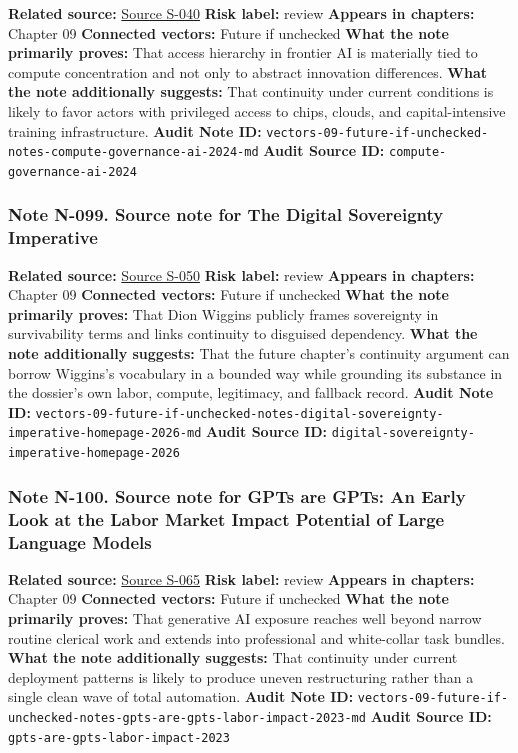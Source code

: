 \documentclass[
  american,
  11pt,
  letterpaper,
]{article}
\begin{document}
\textbf{Related source:}
\hyperref[source-s-040-computing-power-and-the-governance-of-artificial-intelligence]{Source
S-040} \textbf{Risk label:} review \textbf{Appears in chapters:} Chapter
09 \textbf{Connected vectors:} Future if unchecked \textbf{What the note
primarily proves:} That access hierarchy in frontier AI is materially
tied to compute concentration and not only to abstract innovation
differences. \textbf{What the note additionally suggests:} That
continuity under current conditions is likely to favor actors with
privileged access to chips, clouds, and capital-intensive training
infrastructure. \textbf{Audit Note ID:}
\texttt{vectors-09-future-if-unchecked-notes-compute-governance-ai-2024-md}
\textbf{Audit Source ID:} \texttt{compute-governance-ai-2024}

\subsubsection{Note N-099. Source note for The Digital Sovereignty
Imperative}\label{note-n-099-vectors-09-future-if-unchecked-notes-digital-sovereignty-imperative-homepage-2026-md}

\textbf{Related source:}
\hyperref[source-s-050-the-digital-sovereignty-imperative]{Source S-050}
\textbf{Risk label:} review \textbf{Appears in chapters:} Chapter 09
\textbf{Connected vectors:} Future if unchecked \textbf{What the note
primarily proves:} That Dion Wiggins publicly frames sovereignty in
survivability terms and links continuity to disguised dependency.
\textbf{What the note additionally suggests:} That the future chapter's
continuity argument can borrow Wiggins's vocabulary in a bounded way
while grounding its substance in the dossier's own labor, compute,
legitimacy, and fallback record. \textbf{Audit Note ID:}
\texttt{vectors-09-future-if-unchecked-notes-digital-sovereignty-imperative-homepage-2026-md}
\textbf{Audit Source ID:}
\texttt{digital-sovereignty-imperative-homepage-2026}

\subsubsection{Note N-100. Source note for GPTs are GPTs: An Early Look
at the Labor Market Impact Potential of Large Language
Models}\label{note-n-100-vectors-09-future-if-unchecked-notes-gpts-are-gpts-labor-impact-2023-md}

\textbf{Related source:}
\hyperref[source-s-065-gpts-are-gpts-an-early-look-at-the-labor-market-impact-potential-of-large-language-models]{Source
S-065} \textbf{Risk label:} review \textbf{Appears in chapters:} Chapter
09 \textbf{Connected vectors:} Future if unchecked \textbf{What the note
primarily proves:} That generative AI exposure reaches well beyond
narrow routine clerical work and extends into professional and
white-collar task bundles. \textbf{What the note additionally suggests:}
That continuity under current deployment patterns is likely to produce
uneven restructuring rather than a single clean wave of total
automation. \textbf{Audit Note ID:}
\texttt{vectors-09-future-if-unchecked-notes-gpts-are-gpts-labor-impact-2023-md}
\textbf{Audit Source ID:} \texttt{gpts-are-gpts-labor-impact-2023}
\end{document}
